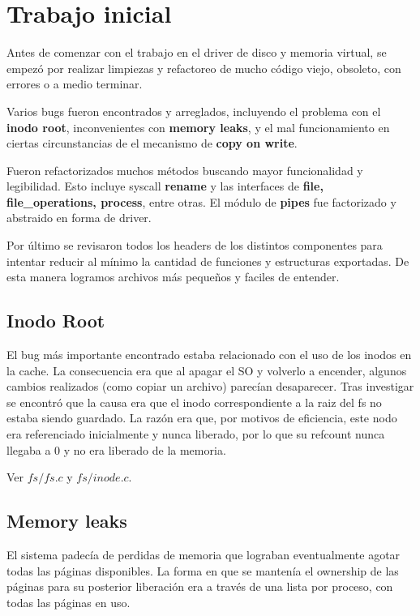 \section{Trabajo inicial}

Antes de comenzar con el trabajo en el driver de disco y memoria virtual, se
empezó por realizar limpiezas y refactoreo de mucho código viejo, obsoleto, con
errores o a medio terminar.

Varios bugs fueron encontrados y arreglados, incluyendo el problema con el
\textbf{inodo root}, inconvenientes con \textbf{memory leaks}, y el mal
funcionamiento en ciertas circunstancias de el mecanismo de \textbf{copy on
write}.

Fueron refactorizados muchos métodos buscando mayor funcionalidad y legibilidad.
Esto incluye syscall \textbf{rename} y las interfaces de \textbf{file,
file\_operations, process}, entre otras. El módulo de \textbf{pipes} fue
factorizado y abstraido en forma de driver.

Por último se revisaron todos los headers de los distintos componentes para
intentar reducir al mínimo la cantidad de funciones y estructuras exportadas. De
esta manera logramos archivos más pequeños y faciles de entender.

\subsection{Inodo Root}

El bug más importante encontrado estaba relacionado con el uso de los inodos en
la cache. La consecuencia era que al apagar el SO y volverlo a encender, algunos
cambios realizados (como copiar un archivo) parecían desaparecer. Tras
investigar se encontró que la causa era que el inodo correspondiente a la raiz
del fs no estaba siendo guardado. La razón era que, por motivos de eficiencia,
este nodo era referenciado inicialmente y nunca liberado, por lo que su refcount
nunca llegaba a 0 y no era liberado de la memoria.

Ver $fs/fs.c$ y $fs/inode.c$.

\subsection{Memory leaks}

El sistema padecía de perdidas de memoria que lograban eventualmente agotar
todas las páginas disponibles. La forma en que se mantenía el ownership de las
páginas para su posterior liberación era a través de una lista por proceso, con
todas las páginas en uso.

